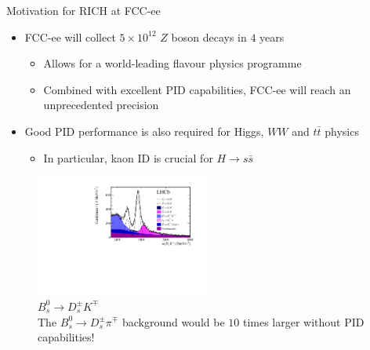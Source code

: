 \documentclass{beamer}
\begin{document}
\begin{frame}{Motivation for RICH at FCC-ee}
  \begin{itemize}
    \setlength\itemsep{0.7em}
    \item{FCC-ee will collect $5\times 10^{12}$ $Z$ boson decays in $4$ years}
    \begin{itemize}
      \item{Allows for a world-leading flavour physics programme}
      \item{Combined with excellent PID capabilities, FCC-ee will reach an unprecedented precision}
    \end{itemize}
    \item{Good PID performance is also required for Higgs, $WW$ and $t\bar{t}$ physics}
    \begin{itemize}
      \item{In particular, kaon ID is crucial for $H\to s\bar{s}$}
    \end{itemize}
  \end{itemize}
  \begin{figure}
    \centering
    \vspace{-0.2cm}
    \includegraphics[height = 4cm]{Plots/LHCb_BsDsK.pdf}
    \caption{$B_s^0\to D_s^\pm K^\mp$\\The $B_s^0\to D_s^\pm\pi^\mp$ background would be $10$ times larger without PID capabilities!}
  \end{figure}
\end{frame}
\end{document}
